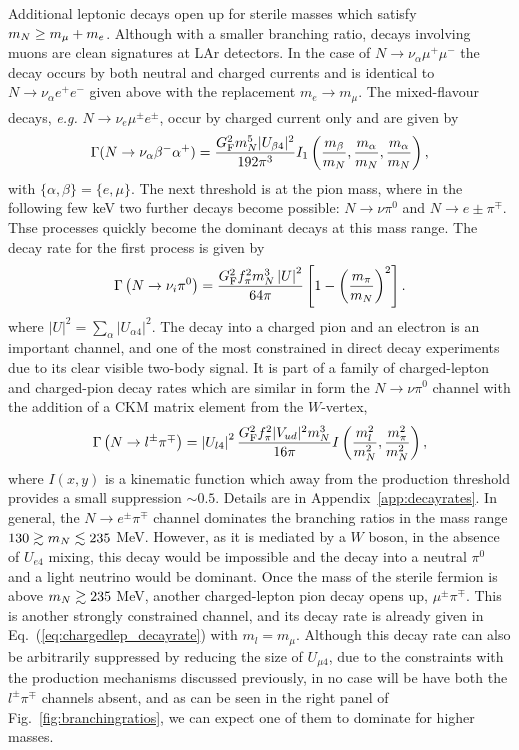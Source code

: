 \documentclass[11pt, a4paper]{article}
\newcommand{\refeq}[1]{Eq.~(\ref{#1})}
\newcommand{\reffig}[1]{Fig.~\ref{#1}}
\newcommand{\refapp}[1]{Appendix~\ref{#1}}
\def\ster{\ensuremath N}
\newcounter{CommentCount}
\newcommand{\marcom}[2]{\textsuperscript{\textcolor{#1}{\theCommentCount}}\marginpar{\textsuperscript{\textcolor{#1}{\theCommentCount}}\textcolor{#1}{{\small#1: #2}}}\stepcounter{CommentCount}}
\begin{document}
Additional leptonic decays open up for sterile masses which satisfy $m_\ster
\geq m_\mu+m_e$. Although with a smaller branching ratio, decays involving
muons are clean signatures at LAr detectors. In the case of $N\rightarrow
\nu_\alpha \mu^+ \mu^-$ the decay occurs by both neutral and charged currents
and is identical to $N\rightarrow \nu_\alpha e^+ e^-$ given above with the
replacement $m_e \rightarrow m_\mu$.  The mixed-flavour decays, \emph{e.g.}
$N\rightarrow \nu_e \mu^\pm e^\pm$, occur by charged current only and are given
by \marcom{PB}{Can we add a line about how?}
%
\[ \Gamma(\ster\to\nu_{\alpha} \beta^- \alpha^+) = \frac{G_\text{F}^2m_\ster^5
|U_{\beta 4}|^2}{192 \pi^3} I_1\left(\frac{m_\beta}{m_N},\frac{ m_\alpha}{m_N},
\frac{ m_\alpha}{m_N} \right) , \] 
%
with $\{\alpha,\beta\} = \{e, \mu\}$. The next threshold is at the pion mass,
where in the following few keV two further decays become possible: $N\to\nu
\pi^0$ and $N\to e\pm\pi^\mp$. Thse processes quickly become the dominant
decays at this mass range. 
%
The decay rate for the first process is given by
%
\[ \Gamma\left(\ster \to \nu_i \pi^0\right) =
\frac{G_\text{F}^2f_\pi^2m_\ster^3\left|U\right|^2}{64\pi} \left[1-\left(
\frac{m_\pi}{m_\ster} \right)^2\right].  \]
%
where $\left|U\right|^2 = \sum_{\alpha}\left|U_{\alpha 4}\right|^2$.
%
The decay into a charged pion and an electron is an important channel, and one
of the most constrained in direct decay experiments due to its clear visible
two-body signal.  It is part of a family of charged-lepton and charged-pion
decay rates which are similar in form the $N\to \nu \pi^0$ channel with the
addition of a CKM matrix element from the $W$-vertex,
%
\begin{align} \Gamma\left(\ster\to l^\pm\pi^\mp\right) =
\left|U_{l4}\right|^2\frac{G_\text{F}^2f_\pi^2 |V_{ud}|^2
m_\ster^3}{16\pi}I\left(\frac{m_l^2}{m_\ster^2} ,
\frac{m_\pi^2}{m_\ster^2}\right) , \label{eq:chargedlep_decayrate}\end{align}
%
where $I(x,y)$ is a kinematic function which away from the production threshold
provides a small suppression $\sim 0.5$. Details are in
\refapp{app:decayrates}.
%
In general, the $N\to e^\pm\pi^\mp$ channel dominates the branching ratios in
the mass range $130 \gtrsim m_\ster \lesssim 235$ MeV. However, as it is
mediated by a $W$ boson, in the absence of $U_{e4}$ mixing, this decay would be
impossible and the decay into a neutral $\pi^0$ and a light neutrino would be
dominant. Once the mass of the sterile fermion is above $m_\ster \gtrsim 235$
MeV, another charged-lepton pion decay opens up, $\mu^\pm\pi^\mp$. This is
another strongly constrained channel, and its decay rate is already given in
\refeq{eq:chargedlep_decayrate} with $m_l = m_\mu$. Although this decay rate
can also be arbitrarily suppressed by reducing the size of $U_{\mu 4}$, due to
the constraints with the production mechanisms discussed previously, in no case
will be have both the $l^\pm\pi^\mp$ channels absent, and as can be seen in the
right panel of \reffig{fig:branchingratios}, we can expect one of them to
dominate for higher masses.
\end{document}
